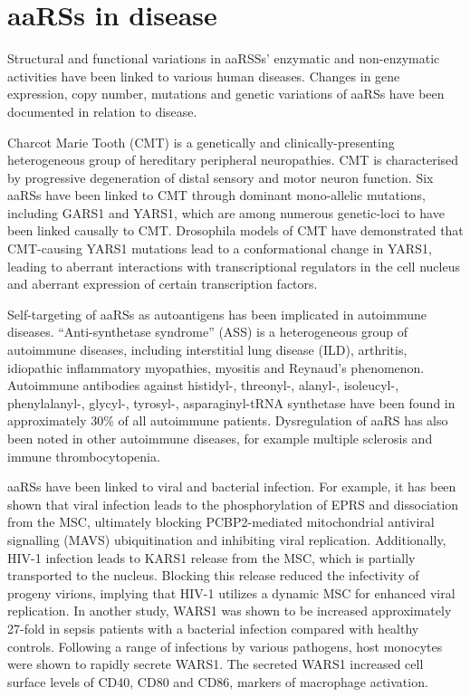 \section{aaRSs in disease}
Structural and functional variations in aaRSSs' enzymatic and non-enzymatic activities have been linked to various human diseases.
Changes in gene expression, copy number, mutations and genetic variations of aaRSs have been documented in relation to disease\cite{kwon2019aminoacyl}.

Charcot Marie Tooth (CMT) is a genetically and clinically-presenting heterogeneous group of hereditary peripheral neuropathies.
CMT is characterised by progressive degeneration of distal sensory and motor neuron function\cite{yao2013aminoacyl}.
Six aaRSs have been linked to CMT through dominant mono-allelic mutations, including GARS1 and YARS1, which are among numerous genetic-loci to have been linked causally to CMT.
Drosophila models of CMT have demonstrated that CMT-causing YARS1 mutations lead to a conformational change in YARS1, leading to aberrant interactions with transcriptional regulators in the cell nucleus and aberrant expression of certain transcription factors\cite{bervoets2019transcriptional}.

Self-targeting of aaRSs as autoantigens has been implicated in autoimmune diseases.
``Anti-synthetase syndrome'' (ASS) is a heterogeneous group of autoimmune diseases, including interstitial lung disease (ILD), arthritis, idiopathic inflammatory myopathies, myositis and Reynaud's phenomenon\cite{park2008aminoacyl}.
Autoimmune antibodies against histidyl-, threonyl-, alanyl-, isoleucyl-, phenylalanyl-, glycyl-, tyrosyl-, asparaginyl-tRNA synthetase have been found in approximately 30\% of all autoimmune patients\cite{park2008aminoacyl}.
Dysregulation of aaRS has also been noted in other autoimmune diseases, for example multiple sclerosis and immune thrombocytopenia\cite{nie2019roles}.

aaRSs have been linked to viral and bacterial infection.
For example, it has been shown that viral infection leads to the phosphorylation of EPRS and dissociation from the MSC, ultimately blocking PCBP2-mediated mitochondrial antiviral signalling (MAVS) ubiquitination and inhibiting viral replication\cite{lee2016infection}.
Additionally, HIV-1 infection leads to KARS1 release from the MSC, which is partially transported to the nucleus\cite{duchon2017hiv}.
Blocking this release reduced the infectivity of progeny virions, implying that HIV-1 utilizes a dynamic MSC for enhanced viral replication\cite{duchon2017hiv}.
In another study, WARS1 was shown to be increased approximately 27-fold in sepsis patients with a bacterial infection compared with healthy controls\cite{ahn2016secreted}.
Following a range of infections by various pathogens, host monocytes were shown to rapidly secrete WARS1.
The secreted WARS1 increased cell surface levels of CD40, CD80 and CD86, markers of macrophage activation\cite{ahn2016secreted}.

